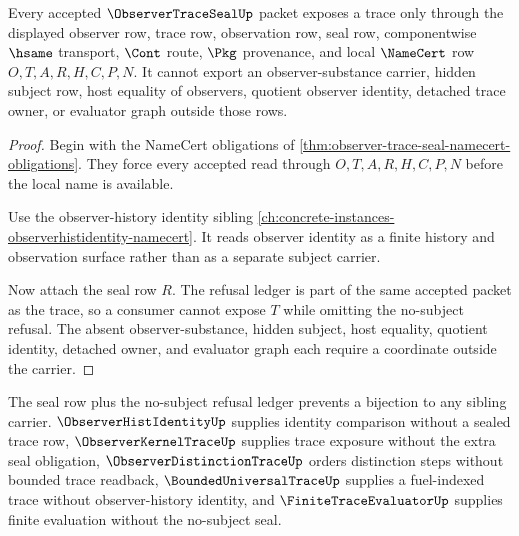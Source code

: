 \begin{theorem}
\label{thm:observer-trace-seal-non-subject-nonescape}
Every accepted $\ObserverTraceSealUp$ packet exposes a trace only through the displayed observer row, trace row, observation row, seal row, componentwise $\hsame$ transport, $\Cont$ route, $\Pkg$ provenance, and local $\NameCert$ row $O,T,A,R,H,C,P,N$. It cannot export an observer-substance carrier, hidden subject row, host equality of observers, quotient observer identity, detached trace owner, or evaluator graph outside those rows.
\end{theorem}
\begin{proof}
Begin with the NameCert obligations of \autoref{thm:observer-trace-seal-namecert-obligations}. They force every accepted read through $O,T,A,R,H,C,P,N$ before the local name is available.

Use the observer-history identity sibling \autoref{ch:concrete-instances-observerhistidentity-namecert}. It reads observer identity as a finite history and observation surface rather than as a separate subject carrier.

Now attach the seal row $R$. The refusal ledger is part of the same accepted packet as the trace, so a consumer cannot expose $T$ while omitting the no-subject refusal. The absent observer-substance, hidden subject, host equality, quotient identity, detached owner, and evaluator graph each require a coordinate outside the carrier.
\end{proof}



The seal row plus the no-subject refusal ledger prevents a bijection to any sibling carrier. $\ObserverHistIdentityUp$ supplies identity comparison without a sealed trace row, $\ObserverKernelTraceUp$ supplies trace exposure without the extra seal obligation, $\ObserverDistinctionTraceUp$ orders distinction steps without bounded trace readback, $\BoundedUniversalTraceUp$ supplies a fuel-indexed trace without observer-history identity, and $\FiniteTraceEvaluatorUp$ supplies finite evaluation without the no-subject seal.

